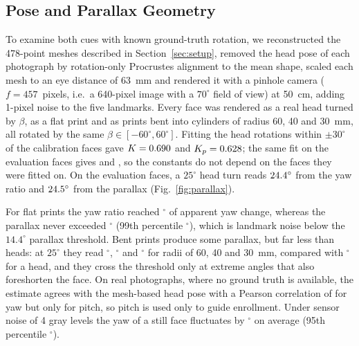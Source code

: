 \documentclass[journal]{IEEEtran}
\begin{document}
\subsection{Pose and Parallax Geometry}\label{sec:pose}
To examine both cues with known ground-truth rotation, we reconstructed the 478-point meshes described in Section~\ref{sec:setup}, removed the head pose of each photograph by rotation-only Procrustes alignment to the mean shape, scaled each mesh to an eye distance of 63~mm and rendered it with a pinhole camera ($f=457$~pixels, i.e.\ a 640-pixel image with a $70^\circ$ field of view) at 50~cm, adding 1-pixel noise to the five landmarks. Every face was rendered as a real head turned by $\beta$, as a flat print and as prints bent into cylinders of radius 60, 40 and 30~mm, all rotated by the same $\beta\in[-60^\circ,60^\circ]$. Fitting the head rotations within $\pm30^\circ$ of the \parFacesCal{} calibration faces gave $K=0.690$ and $K_p=0.628$; the same fit on the \parFacesEval{} evaluation faces gives \parKratioEval{} and \parKparEval{}, so the constants do not depend on the faces they were fitted on. On the evaluation faces, a $25^\circ$ head turn reads $24.4^\circ$ from the yaw ratio and $24.5^\circ$ from the parallax (Fig.~\ref{fig:parallax}).

For flat prints the yaw ratio reached \parFlatRatioMax$^\circ$ of apparent yaw change, whereas the parallax never exceeded \parFlatParMax$^\circ$ (99th percentile \parFlatParQ$^\circ$), which is landmark noise below the $14.4^\circ$ parallax threshold. Bent prints produce some parallax, but far less than heads: at $25^\circ$ they read \parBentSixtyParTwentyFive$^\circ$, \parBentFortyParTwentyFive$^\circ$ and \parBentThirtyParTwentyFive$^\circ$ for radii of 60, 40 and 30~mm, compared with \parHeadParTwentyFive$^\circ$ for a head, and they cross the threshold only at extreme angles that also foreshorten the face. On real photographs, where no ground truth is available, the estimate agrees with the mesh-based head pose with a Pearson correlation of \poseR{} for yaw but only \posePitchR{} for pitch, so pitch is used only to guide enrollment. Under sensor noise of 4 gray levels the yaw of a still face fluctuates by \poseJitter$^\circ$ on average (95th percentile \poseJitterQ$^\circ$).
\end{document}
